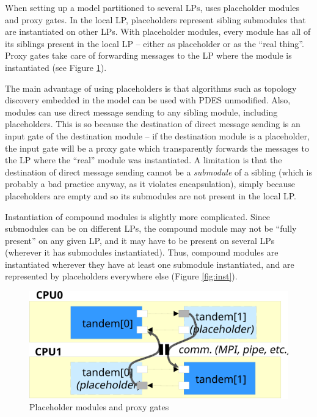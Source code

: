 When setting up a model partitioned to several LPs,
{\opp} uses placeholder modules and proxy gates.
In the local LP, placeholders represent sibling submodules
that are instantiated on other LPs.
With placeholder modules, every module has all of its siblings
present in the local LP -- either as placeholder or as the ``real thing''.
Proxy gates take care of forwarding messages to the LP where
the module is instantiated (see Figure \ref{fig:plach}).

The main advantage of using placeholders is that algorithms such as
topology discovery embedded in the model can be used with PDES unmodified.
Also, modules can use direct message sending to any sibling module,
including placeholders. This is so because the destination of direct message
sending is an input gate of the destination module -- if the destination
module is a placeholder, the input gate will be a proxy gate which
transparently forwards the messages to the LP where the ``real'' module
was instantiated. A limitation is that the destination of direct message
sending cannot be a \textit{submodule} of a sibling (which is
probably a bad practice anyway, as it violates encapsulation),
simply because placeholders are empty and so its submodules are
not present in the local LP.

Instantiation of compound modules is slightly more complicated.
Since submodules can be on different LPs, the compound module may
not be ``fully present'' on any given LP, and it may have to be
present on several LPs (wherever it has submodules instantiated).
Thus, compound modules are instantiated wherever they have
at least one submodule instantiated, and are represented by placeholders
everywhere else (Figure \ref{fig:inst}).


\begin{figure}[htbp]
  \begin{center}
    \includegraphics{figures/parsim-placeholders}
    \caption{Placeholder modules and proxy gates}
    \label{fig:plach}
  \end{center}
\end{figure}

